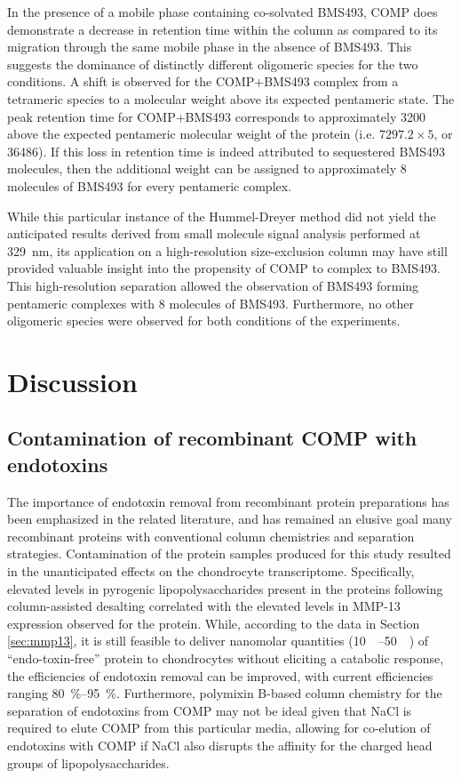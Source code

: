 \begin{refsection}
In the presence of a mobile phase containing co-solvated BMS493, COMP does
demonstrate a decrease in retention time within the column as compared to its
migration through the same mobile phase in the absence of BMS493. This suggests
the dominance of distinctly different oligomeric species for the two conditions.
A shift is observed for the COMP+BMS493 complex from a tetrameric species to a
molecular weight above its expected pentameric state. The peak retention time
for COMP+BMS493 corresponds to approximately \SI{3200}{\Da} above the expected
pentameric molecular weight of the protein (i.e. ${7297.2 \times 5}$, or
\SI{36486}{\Da}). If this loss in retention time is indeed attributed to
sequestered BMS493 molecules, then the additional weight can be assigned to
approximately 8 molecules of BMS493 for every pentameric complex.

While this particular instance of the Hummel-Dreyer method did not yield the
anticipated results derived from small molecule signal analysis performed at
\SI{329}{\nm}, its application on a high-resolution size-exclusion column may
have still provided valuable insight into the propensity of COMP to complex to
BMS493. This high-resolution separation allowed the observation of BMS493
forming pentameric complexes with 8 molecules of BMS493. Furthermore, no other
oligomeric species were observed for both conditions of the experiments.

\section{Discussion}
\subsection{Contamination of recombinant COMP with endotoxins}
The importance of endotoxin removal from recombinant protein preparations has
been emphasized in the related literature,\cite{Petsch2000,Sengupta2010} and
has remained an elusive goal many recombinant proteins with conventional
column chemistries and separation strategies.\cite{Chen2009,Liu1997,Ritzen2007}
Contamination of the protein samples produced for this study resulted in the
unanticipated effects on the chondrocyte transcriptome. Specifically, elevated
levels in pyrogenic lipopolysaccharides present in the proteins following
column-assisted desalting correlated with the elevated levels in MMP-13
expression observed for the protein. While, according to the data in Section
\ref{sec:mmp13}, it is still feasible to deliver nanomolar quantities
(\SIrange{10}{50}{\nano\moLar}) of ``endo-toxin-free'' protein to chondrocytes
without eliciting a catabolic response, the efficiencies of endotoxin removal
can be improved, with current efficiencies ranging \SIrange{80}{95}{\percent}.
Furthermore, polymixin B-based column chemistry for the separation of endotoxins
from COMP may not be ideal given that NaCl is required to elute COMP from this
particular media, allowing for co-elution of endotoxins with COMP if NaCl also
disrupts the affinity for the charged head groups of lipopolysaccharides.


\end{refsection}
